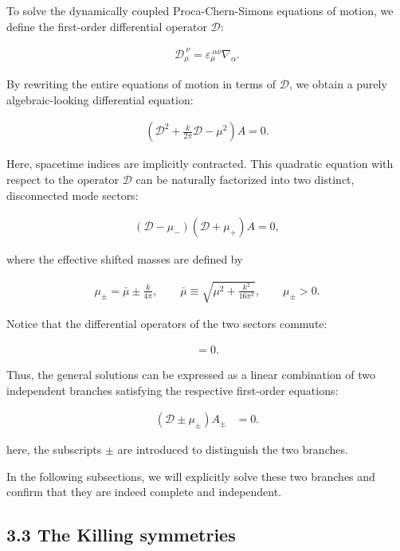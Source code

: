 To solve the dynamically coupled Proca-Chern-Simons equations of motion, we define the first-order differential operator $\mathcal{D}$:

\begin{align}
\mathcal{D}_\mu^{~\nu} = \varepsilon_\mu^{~\alpha \nu}\nabla_\alpha.
\end{align}

By rewriting the entire equations of motion in terms of $\mathcal{D}$, we obtain a purely algebraic-looking differential equation:

\begin{align}
\left( \mathcal{D}^2 + \frac{k}{2\pi}\mathcal{D} - \mu^2 \right) A = 0.
\end{align}

Here, spacetime indices are implicitly contracted. This quadratic equation with respect to the operator $\mathcal{D}$ can be naturally factorized into two distinct, disconnected mode sectors:

\begin{align}
(\mathcal{D} - \mu_-)(\mathcal{D} + \mu_+) A = 0,
\end{align}

where the effective shifted masses are defined by

\begin{align}
\mu_{\pm} = \bar{\mu} \pm \frac{k}{4\pi}, \qquad \bar{\mu} \equiv \sqrt{\mu^2 + \frac{k^2}{16\pi^2}}, \qquad \mu_{\pm} > 0.
\end{align}

Notice that the differential operators of the two sectors commute:

\begin{align}
[\mathcal{D}-\mu_{-}, \mathcal{D}+\mu_{+}] = 0.
\end{align}

Thus, the general solutions can be expressed as a linear combination of two independent branches satisfying the respective first-order equations:

 \begin{align}
(\mathcal{D} \pm \mu_\pm) A_\pm & = 0.
\end{align}

here, the subscripts $\displaystyle{\pm}$ are introduced to distinguish the two branches.

In the following subsections, we will explicitly solve these two branches and confirm that they are indeed complete and independent.

\subsection{3.3 The Killing symmetries}\label{subsec:killing-symmetries}

